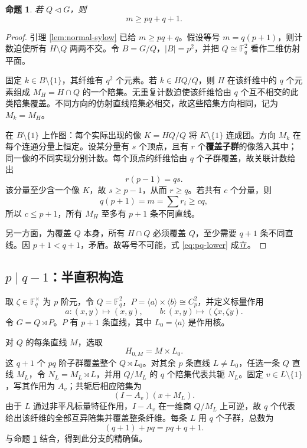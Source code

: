 \documentclass[11pt,a4paper]{article}
\numberwithin{equation}{section}
\theoremstyle{plain}
\newtheorem{proposition}[theorem]{命题}
\theoremstyle{definition}
\theoremstyle{remark}
\newcommand{\F}{\mathbb{F}}
\begin{document}
\begin{proposition}\label{prop:pq-lower}
若 $Q\triangleleft G$，则
\begin{equation}\label{eq:pq-lower}
 m\ge pq+q+1.
\end{equation}
\end{proposition}
\begin{proof}
引理 \ref{lem:normal-sylow} 已给 $m\ge pq+q$。假设等号 $m=q(p+1)$，则计数迫使所有 $H\setminus Q$ 两两不交。令 $B=G/Q$，$|B|=p^2$，并把 $Q\cong\F_q^2$ 看作二维仿射平面。

固定 $k\in B\setminus\{1\}$，其纤维有 $q^2$ 个元素。若 $k\in HQ/Q$，则 $H$ 在该纤维中的 $q$ 个元素组成 $M_H=H\cap Q$ 的一个陪集。无重复计数迫使该纤维恰由 $q$ 个互不相交的此类陪集覆盖。不同方向的仿射直线陪集必相交，故这些陪集方向相同，记为 $M_k=M_H$。

在 $B\setminus\{1\}$ 上作图：每个实际出现的像 $K=HQ/Q$ 将 $K\setminus\{1\}$ 连成团。方向 $M_k$ 在每个连通分量上恒定。设某分量有 $s$ 个顶点，且有 $r$ 个\textbf{覆盖子群}的像落入其中；同一像的不同实现分别计数。每个顶点的纤维恰由 $q$ 个子群覆盖，故关联计数给出
\begin{equation}
 r(p-1)=qs.
\end{equation}
该分量至少含一个像 $K$，故 $s\ge p-1$，从而 $r\ge q$。若共有 $c$ 个分量，则
\begin{equation}
 q(p+1)=m=\sum r_i\ge cq,
\end{equation}
所以 $c\le p+1$，所有 $M_H$ 至多有 $p+1$ 条不同直线。

另一方面，为覆盖 $Q$ 本身，所有 $H\cap Q$ 必须覆盖 $Q$，至少需要 $q+1$ 条不同直线。因 $p+1<q+1$，矛盾。故等号不可能，式 \eqref{eq:pq-lower} 成立。
\end{proof}

\subsection{\texorpdfstring{$p\mid q-1$}{p|q-1}：半直积构造}
取 $\zeta\in\F_q^\times$ 为 $p$ 阶元，令 $Q=\F_q^2$，$P=\langle a\rangle\times\langle b\rangle\cong C_p^2$，并定义标量作用
\begin{equation}
 a:(x,y)\mapsto(x,y),\qquad
 b:(x,y)\mapsto(\zeta x,\zeta y).
\end{equation}
令 $G=Q\rtimes P$。$P$ 有 $p+1$ 条直线，其中 $L_0=\langle a\rangle$ 是作用核。

对 $Q$ 的每条直线 $M$，选取
\begin{equation}
 H_{0,M}=M\times L_0.
\end{equation}
这 $q+1$ 个 $pq$ 阶子群覆盖整个 $Q\rtimes L_0$。对其余 $p$ 条直线 $L\ne L_0$，任选一条 $Q$ 直线 $M_L$，令 $N_L=M_L\rtimes L$，并用 $Q/M_L$ 的 $q$ 个陪集代表共轭 $N_L$。固定 $v\in L\setminus\{1\}$，写其作用为 $A_v$；共轭后相应陪集为
\begin{equation}
 (I-A_v)(x+M_L).
\end{equation}
由于 $L$ 通过非平凡标量特征作用，$I-A_v$ 在一维商 $Q/M_L$ 上可逆，故 $q$ 个代表给出该纤维的全部互异陪集并覆盖整条纤维。每条 $L$ 用 $q$ 个子群，总数为
\begin{equation}\label{eq:pq-action-count}
 (q+1)+pq=pq+q+1.
\end{equation}
与命题 \ref{prop:pq-lower} 结合，得到此分支的精确值。
\end{document}
